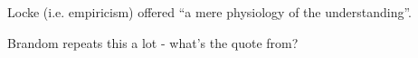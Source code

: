 Locke (i.e. empiricism) offered ``a mere physiology of the understanding''.

Brandom repeats this a lot - what's the quote from?